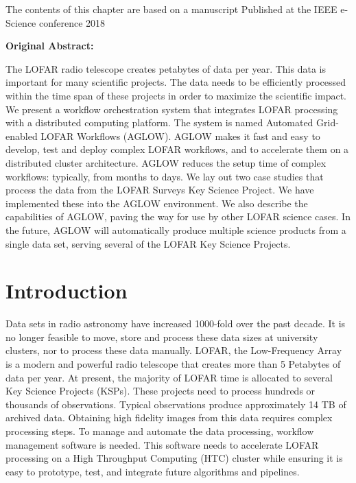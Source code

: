 \begin{frshaded*}
    The contents of this chapter are based on a manuscript Published at the IEEE e-Science conference 2018
\end{frshaded*}
%

\setlength\FrameRule{1.5pt}
\begin{frshaded*}
    \textbf{Original Abstract:}

The LOFAR radio telescope creates petabytes of data per year. This data is important for many scientific projects. The data needs to be efficiently processed within the time span of these projects in order to maximize the scientific impact. We present a workflow orchestration system that integrates LOFAR processing with a distributed computing platform. The system is named Automated Grid-enabled LOFAR Workflows (AGLOW). AGLOW makes it fast and easy to develop, test and deploy complex LOFAR workflows, and to accelerate them on a distributed cluster architecture. AGLOW reduces the setup time of complex workflows: typically, from months to days. We lay out two case studies that process the data from the LOFAR Surveys Key Science Project. We have implemented these into the AGLOW environment. We also describe the capabilities of AGLOW, paving the way for use by other LOFAR science cases. In the future, AGLOW will automatically produce multiple science products from a single data set, serving several of the LOFAR Key Science Projects.
\end{frshaded*}
%
%
\section{Introduction}\label{sec:ch5_intro}

Data sets in radio astronomy have increased 1000-fold over the past decade\cite{sabater_datasize}. It is no longer feasible to move, store and process these data sizes at university clusters, nor to process these data manually. LOFAR, the Low-Frequency Array\cite{LOFAR} is a modern and powerful radio telescope that creates more than 5 Petabytes of data per year. At present, the majority of LOFAR time is allocated to several Key Science Projects (KSPs)\cite{lotss}. These projects need to process hundreds or thousands of observations. Typical observations produce approximately 14 TB of archived data. Obtaining high fidelity images from this data requires complex processing steps. To manage and automate the data processing, workflow management software is needed. This software needs to accelerate LOFAR processing on a High Throughput Computing (HTC) cluster while ensuring it is easy to prototype, test, and integrate future algorithms and pipelines. 
	
